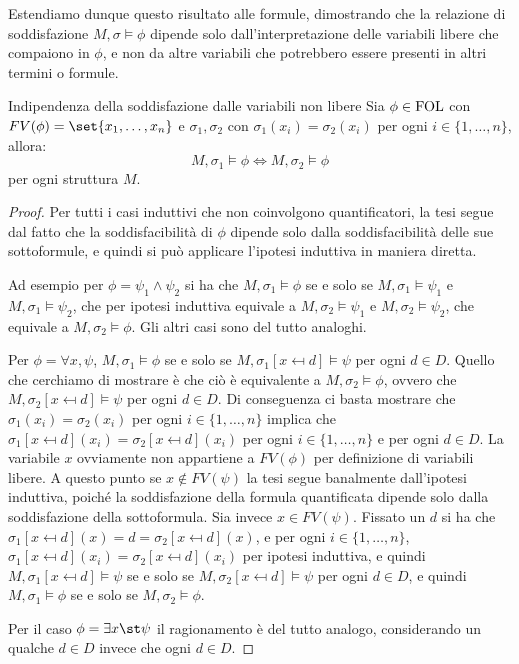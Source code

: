 Estendiamo dunque questo risultato alle formule, dimostrando che la relazione di soddisfazione \(M,\sigma\models \phi\) dipende solo dall'interpretazione delle variabili libere che compaiono in \(\phi\), e non da altre variabili che potrebbero essere presenti in altri termini o formule.

\begin{proposition}[namedlabel={prop:satisfaction_independence}{Indipendenza della soddisfazione dalle variabili non libere}]{Indipendenza della soddisfazione dalle variabili non libere}
  Sia \(\phi\in\FOL\) con \(FV(\phi) = \set{x_1, \ldots, x_n}\) e \(\sigma_1,\sigma_2\) con \(\sigma_1(x_i) = \sigma_2(x_i)\) per ogni \(i\in\{1,\ldots,n\}\), allora:
  \[M,\sigma_1\models \phi \iff M,\sigma_2 \models \phi\]
  per ogni struttura \(M\).
\end{proposition}

\begin{proof}

  Per tutti i casi induttivi che non coinvolgono quantificatori, la tesi segue dal fatto che la soddisfacibilità di \(\phi\) dipende solo dalla soddisfacibilità delle sue sottoformule, e quindi si può applicare l'ipotesi induttiva in maniera diretta.
  
  Ad esempio per \(\phi = \psi_1 \land \psi_2\) si ha che \(M,\sigma_1\models \phi\) se e solo se \(M,\sigma_1\models \psi_1\) e \(M,\sigma_1\models \psi_2\), che per ipotesi induttiva equivale a \(M,\sigma_2\models \psi_1\) e \(M,\sigma_2\models \psi_2\), che equivale a \(M,\sigma_2\models \phi\). Gli altri casi sono del tutto analoghi.

  Per \(\phi = \forall x, \psi\), \(M,\sigma_1\models \phi\) se e solo se \(M,\sigma_1[x\mapsfrom d]\models \psi\) per ogni \(d\in D\). Quello che cerchiamo di mostrare è che ciò è equivalente a \(M,\sigma_2\models \phi\), ovvero che \(M,\sigma_2[x\mapsfrom d]\models \psi\) per ogni \(d\in D\). Di conseguenza ci basta mostrare che \(\sigma_1(x_i) = \sigma_2(x_i)\) per ogni \(i\in\{1,\ldots,n\}\) implica che \(\sigma_1[x\mapsfrom d](x_i) = \sigma_2[x\mapsfrom d](x_i)\) per ogni \(i\in\{1,\ldots,n\}\) e per ogni \(d\in D\).
  La variabile \(x\) ovviamente non appartiene a \(FV(\phi)\) per definizione di variabili libere. A questo punto se \(x \notin FV(\psi)\) la tesi segue banalmente dall'ipotesi induttiva, poiché la soddisfazione della formula quantificata dipende solo dalla soddisfazione della sottoformula.
  Sia invece \(x\in FV(\psi)\). Fissato un \(d\) si ha che \(\sigma_1[x\mapsfrom d](x) = d = \sigma_2[x\mapsfrom d](x)\), e per ogni \(i\in\{1,\ldots,n\}\), \(\sigma_1[x\mapsfrom d](x_i) = \sigma_2[x\mapsfrom d](x_i)\) per ipotesi induttiva, e quindi \(M,\sigma_1[x\mapsfrom d]\models \psi\) se e solo se \(M,\sigma_2[x\mapsfrom d]\models \psi\) per ogni \(d\in D\), e quindi \(M,\sigma_1\models \phi\) se e solo se \(M,\sigma_2\models \phi\).

  Per il caso \(\phi = \exists x\st \psi\) il ragionamento è del tutto analogo, considerando un qualche \(d\in D\) invece che ogni \(d\in D\).
\end{proof}


